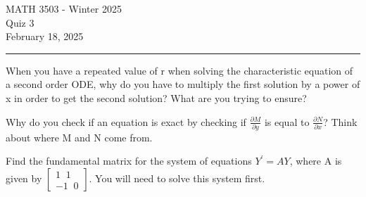 \documentclass[12pt,letterpaper, onecolumn]{exam}
\begin{document}
\begingroup  
    \centering
    \LARGE MATH 3503 - Winter 2025\\
    \LARGE Quiz 3\\[0.5em]
    \large February 18, 2025\\[0.5em]
\endgroup
\rule{\textwidth}{0.4pt}
\pointsdroppedatright   %
\printanswers
\renewcommand{\solutiontitle}{\noindent\textbf{Ans:}\enspace}   %

\begin{questions}
    
    \question[3 Marks] When you have a repeated value of r when solving the characteristic equation of a second order ODE, why do you have to multiply the first solution by a power of x in order to get the second solution? What are you trying to ensure?\droppoints

    \bigskip
    \bigskip
    \bigskip
    \bigskip
    \bigskip
    \bigskip
    \bigskip
    \bigskip
    \bigskip
    \bigskip
    \bigskip
    \bigskip
    \bigskip
    \bigskip
    \bigskip
    \bigskip
    \bigskip
    \bigskip
    
    \question[3 Marks] Why do you check if an equation is exact by checking if $\frac{\partial M}{\partial y}$ is equal to $\frac{\partial N}{\partial x}$? Think about where M and N come from.\droppoints
    
    \pagebreak %
\thispagestyle{empty}   %
    
    \question[4 Marks] Find the fundamental matrix for the system of equations $Y^{'} = A Y$, where A is given by $\begin{bmatrix} 1 \; \; 1 \\ -1 \; \; 0 \end{bmatrix}$. You will need to solve this system first.\droppoints
    
\end{questions}
\end{document}
